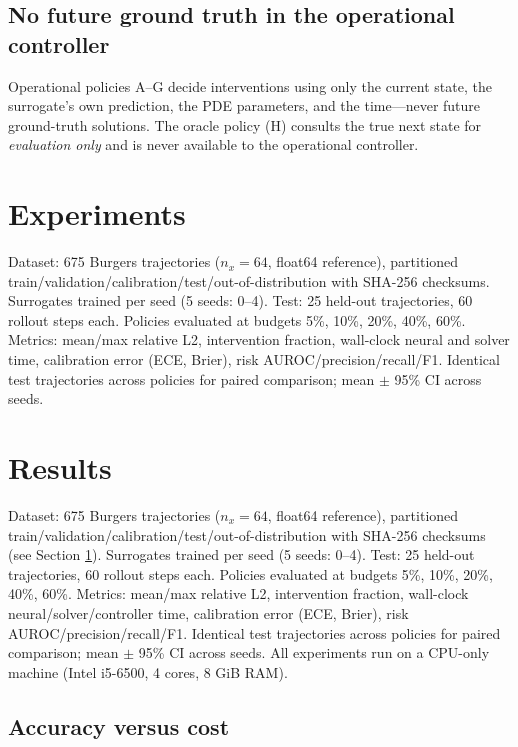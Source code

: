 \documentclass[11pt]{article}
\begin{document}
\subsection{No future ground truth in the operational controller}
Operational policies A--G decide interventions using only the current state, the surrogate's own prediction, the PDE parameters, and the time---never future ground-truth solutions. The oracle policy (H) consults the true next state for \emph{evaluation only} and is never available to the operational controller.

\section{Experiments}
\label{sec:experiments}
Dataset: 675 Burgers trajectories ($n_x=64$, float64 reference), partitioned train/validation/calibration/test/out-of-distribution with SHA-256 checksums. Surrogates trained per seed (5 seeds: 0--4). Test: 25 held-out trajectories, 60 rollout steps each. Policies evaluated at budgets 5\%, 10\%, 20\%, 40\%, 60\%. Metrics: mean/max relative L2, intervention fraction, wall-clock neural and solver time, calibration error (ECE, Brier), risk AUROC/precision/recall/F1. Identical test trajectories across policies for paired comparison; mean $\pm$ 95\% CI across seeds.

\section{Results}
\label{sec:results}

Dataset: 675 Burgers trajectories ($n_x=64$, float64 reference), partitioned
train/validation/calibration/test/out-of-distribution with SHA-256 checksums
(see Section \ref{sec:experiments}). Surrogates trained per seed (5 seeds:
0--4). Test: 25 held-out trajectories, 60 rollout steps each. Policies
evaluated at budgets 5\%, 10\%, 20\%, 40\%, 60\%. Metrics: mean/max relative
L2, intervention fraction, wall-clock neural/solver/controller time,
calibration error (ECE, Brier), risk AUROC/precision/recall/F1. Identical test
trajectories across policies for paired comparison; mean $\pm$ 95\% CI across
seeds. All experiments run on a CPU-only machine (Intel i5-6500, 4 cores,
8 GiB RAM).

\subsection{Accuracy versus cost}
\label{sec:results-acc-cost}
\end{document}
